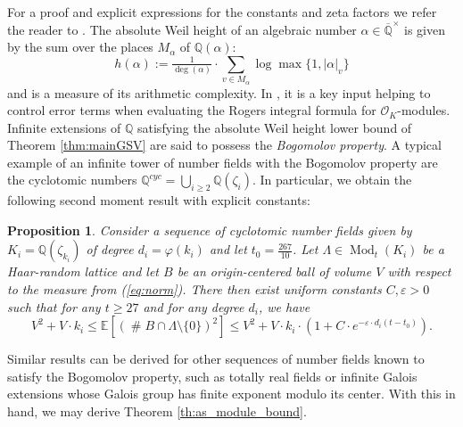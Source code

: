 \documentclass{amsart}
\newtheorem{proposition}[theorem]{Proposition}
\newcommand{\calO}{\mathcal{O}}
\newcommand{\OK}{\mathcal{O}_K}
\DeclareMathOperator{\ML}{Mod}
\DeclareMathOperator{\card}{\texttt{\#}}
\begin{document}
For a proof and explicit expressions for the constants and zeta factors we refer the reader to \cite[Section 5]{GSV23}. The absolute Weil height of an algebraic number $\alpha\in\overline{\mathbb{Q}}^\times$ is given by the sum over the places $M_\alpha$ of $\mathbb{Q}(\alpha)$:
$$h(\alpha):=\tfrac{1}{\deg(\alpha)}\cdot \sum_{v\in M_\alpha} \log \max\{1, |\alpha |_v\}$$
and is a measure of its arithmetic complexity. In \cite{GSV23}, it is a key input helping to control error terms when evaluating the Rogers integral formula for $\OK$-modules. Infinite extensions of $\mathbb{Q}$ satisfying the absolute Weil height lower bound of Theorem \ref{thm:mainGSV} are said to possess the \emph{Bogomolov property}. A typical example of an infinite tower of number fields with the Bogomolov property are the cyclotomic numbers $\mathbb{Q}^{cyc}=\bigcup_{i\geq 2} \mathbb{Q}(\zeta_i)$. In particular, we obtain the following second moment result with explicit constants: 
\begin{proposition}\label{cor:introcyclo}
	Consider a sequence of cyclotomic number fields given by $K_i=\mathbb{Q}(\zeta_{k_i})$ of degree $d_i=\varphi(k_i)$ and let $t_0=\tfrac{267}{10}$. Let $\Lambda \in \ML_{t}(K_i)$ be a Haar-random lattice and let $B$ be an origin-centered ball of volume $V$ with respect to the measure from (\ref{eq:norm}).
There then exist uniform  constants $C,\varepsilon> 0$ such that for any $t\geq 27$ and for any degree $d_i$, we have 
$$ V^2+V\cdot {k_i}\leq\mathbb{E}[\left( \card B \cap \Lambda \setminus \{0\}\right)^2]\leq V^2+V\cdot {k_i}\cdot (1+C\cdot e^{-\varepsilon\cdot d_i(t-t_0)}).$$
\end{proposition}
Similar results can be derived for other sequences of number fields known to satisfy the Bogomolov property, such as totally real fields or infinite Galois extensions whose Galois group has finite exponent modulo its center. With this in hand, we may derive Theorem \ref{th:as_module_bound}.
\end{document}
